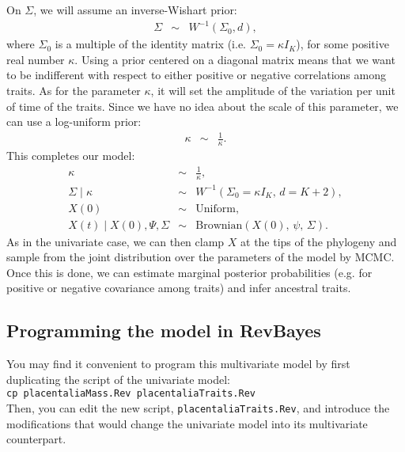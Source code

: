 \documentclass[usletter]{article}
\newcommand{\cmd}[1]{\texttt{#1}}
\begin{document}
On $\Sigma$, we will assume an inverse-Wishart prior:
\begin{eqnarray*}
\Sigma &\sim& W^{-1}(\Sigma_0, d),
\end{eqnarray*}
where $\Sigma_0$ is a multiple of the identity matrix (i.e. $\Sigma_0 = \kappa I_K$), for some positive real number $\kappa$.
Using a prior centered on a diagonal matrix means that we want to be indifferent with respect to either positive or negative correlations among traits. As for the parameter $\kappa$, it will set the amplitude of the variation per unit of time of the traits. Since we have no idea about the scale of this parameter, we can use a log-uniform prior:
\begin{eqnarray*}
\kappa &\sim& \frac{1}{\kappa}.
\end{eqnarray*}
This completes our model:
\begin{eqnarray*}
\kappa &\sim& \frac{1}{\kappa},
\\
\Sigma \mid \kappa &\sim& W^{-1}(\Sigma_0 = \kappa I_K , \, d = K+2),
\\
X(0) &\sim& \text{Uniform},
\\
X(t) \mid X(0), \Psi, \Sigma &\sim& \text{Brownian}(X(0), \, \psi, \, \Sigma).
\end{eqnarray*}
As in the univariate case, we can then clamp $X$ at the tips of the phylogeny and sample from the joint distribution over the parameters of the model by MCMC.
Once this is done, we can estimate marginal posterior probabilities (e.g. for positive or negative covariance among traits) and infer ancestral traits.

\subsection*{Programming the model in RevBayes}

You may find it convenient to program this multivariate model by first duplicating the script of the univariate model:
\\
\cmd{cp placentaliaMass.Rev placentaliaTraits.Rev}
\\
Then, you can edit the new script, \cmd{placentaliaTraits.Rev}, and introduce the modifications that would change the univariate model
into its multivariate counterpart.
\end{document}
